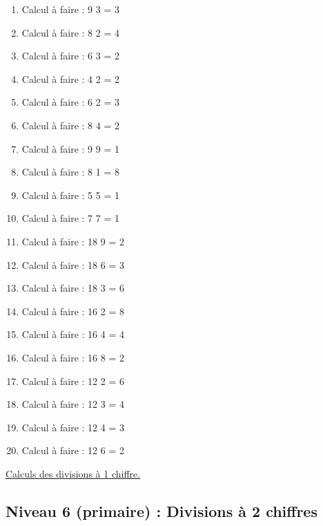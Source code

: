 \documentclass[11pt]{article}
\begin{document}
\begin{enumerate}
\item Calcul à faire :  9 \textdiv{} 3 =  3
\item Calcul à faire :  8 \textdiv{} 2 = 4
\item Calcul à faire :  6 \textdiv{} 3 = 2
\item Calcul à faire :  4 \textdiv{} 2 = 2
\item Calcul à faire :  6 \textdiv{} 2 = 3
\item Calcul à faire :  8 \textdiv{} 4 = 2
\item Calcul à faire :  9 \textdiv{} 9 = 1
\item Calcul à faire :  8 \textdiv{} 1 = 8
\item Calcul à faire :  5 \textdiv{} 5 = 1
\item Calcul à faire :  7 \textdiv{} 7 = 1
\item Calcul à faire :  18 \textdiv{} 9 =  2
\item Calcul à faire :  18 \textdiv{} 6 = 3
\item Calcul à faire :  18 \textdiv{} 3 = 6
\item Calcul à faire :  16 \textdiv{} 2 = 8
\item Calcul à faire :  16 \textdiv{} 4 = 4
\item Calcul à faire :  16 \textdiv{} 8 = 2
\item Calcul à faire :  12 \textdiv{} 2 = 6
\item Calcul à faire :  12 \textdiv{} 3 = 4
\item Calcul à faire :  12 \textdiv{} 4 = 3
\item Calcul à faire :  12 \textdiv{} 6 = 2
\end{enumerate}




\hyperref[org498049f]{Calculs des divisions à 1 chiffre.}






\newpage


\subsection{Niveau 6 (primaire) : Divisions à 2 chiffres}
\label{sec:org9c0ac2f}
\label{orgd3dd92e}
\end{document}
